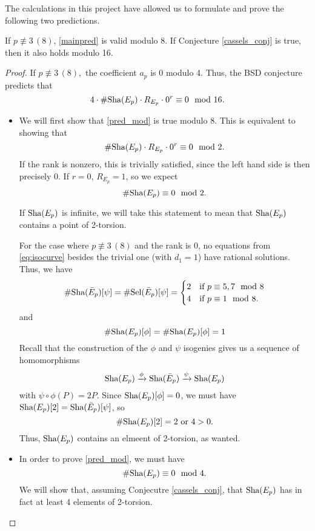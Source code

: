 \documentclass[12pt, a4paper]{report}
\begin{document}
The calculations in this project have allowed us to formulate and prove the
following two predictions.


\begin{thm} \label{mainthm2}
  If $p \not\equiv 3 \, (8)$, \autoref{mainpred} is valid modulo 8. If
  Conjecture \autoref{cassels_conj} is true, then it also holds modulo 16.
\end{thm}
\begin{proof}
  If $p \not\equiv 3 \, (8),$ the coefficient $a_p$ is 0 modulo 4.
  Thus,
  the BSD conjecture predicts that
  \begin{equation} \label{pred_mod}
    4 \cdot \#\text{\normalfont Sha}(E_p) \cdot R_{E_p} \cdot 0^r \equiv 0 \mod{16}.
  \end{equation}

  \begin{itemize}
  \item We will first show that \autoref{pred_mod} is true modulo 8. This is
    equivalent to showing that
    \[\# \text{\normalfont Sha}(E_p) \cdot R_{E_p} \cdot 0^r \equiv 0 \mod{2}.\] 
    If the rank
    is nonzero, this is trivially satisfied, since the left hand side is then
    precisely 0. If $r = 0$, $R_{E_p} = 1$, so we expect
    \[\# \text{\normalfont Sha}(E_p) \equiv 0 \mod{2}.\]
    
    If $\text{\normalfont Sha}(E_p)$ is infinite, we will take this statement to mean that $\text{\normalfont Sha}(E_p)$
    contains a point of 2-torsion.
      
    For the case where $p \not\equiv 3 \, (8)$ and the rank is 0, no equations from
    \ref{eq:isocurve} besides the trivial one (with $d_1 = 1$) have rational
    solutions. Thus, we have
    \[\# \text{\normalfont Sha}(\bar{E}_p)[\psi] = \# \text{\normalfont Sel}(\bar{E}_p)[\psi] =
      \begin{cases}
        2 &\text{if } p \equiv 5,7 \mod{8} \\
        4 &\text{if } p \equiv 1 \mod{8}.
      \end{cases}
    \]
    and
    \[\# \text{\normalfont Sha}(E_p)[\phi] = \# \text{\normalfont Sha}(E_p)[\phi] = 1\] Recall that the construction
    of the $\phi$ and $\psi$ isogenies gives us a sequence of homomorphisms
    \[\text{\normalfont Sha}(E_p) \xrightarrow{\phi} \text{\normalfont Sha}(\bar{E}_p) \xrightarrow{\psi}
      \text{\normalfont Sha}(E_p)\] with $\psi \circ \phi (P) = 2P.$ Since $\text{\normalfont Sha}(E_p)[\phi] = 0$,
    we must have $\text{\normalfont Sha}(E_p)[2] = \text{\normalfont Sha}(\bar{E}_p)[\psi]$, so
    \[\# \text{\normalfont Sha}(E_p)[2] = 2 \text { or } 4 > 0.\]
    Thus, $\text{\normalfont Sha}(E_p)$ contains an elmeent of 2-torsion, as wanted.

  \item In order to prove \autoref{pred_mod}, we must have
    \[\# \text{\normalfont Sha}(E_p) \equiv 0 \mod{4}.\]
    We will show that, assuming Conjecutre \autoref{cassels_conj}, 
    that $\text{\normalfont Sha}(E_p)$ has in fact at least 4 elements of 2-torsion. 


\end{itemize}
\end{proof}
\end{document}
